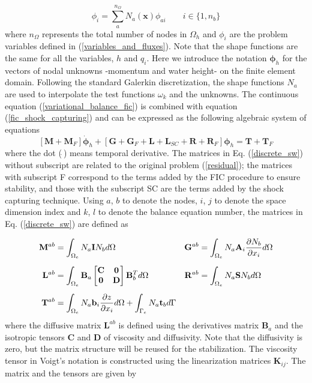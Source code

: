\begin{equation}
\phi_i = \sum_a^{n_\Omega} N_a(\mathbf{x})\phi_{ai} \qquad i \in \{1,n_b\}
\end{equation}
where $n_\Omega$ represents the total number of nodes in $\Omega_h$ and $\phi_i$ are the problem variables defined in (\ref{variables_and_fluxes}).
Note that the shape functions are the same for all the variables, $h$ and $q_i$.
Here we introduce the notation $\bm{\phi}_h$ for the vectors of nodal unknowns -momentum and water height- on the finite element domain. Following the standard Galerkin discretization, the shape functions $N_a$ are used to interpolate the test functions $\omega_k$ and the unknowns. The continuous equation (\ref{variational_balance_fic}) is combined with equation (\ref{fic_shock_capturing}) and can be expressed as the following algebraic system of equations
\begin{equation} \label{discrete_sw}
[\mathbf{M} + \mathbf{M}_F] \dot{\bm{\phi}}_h
+ [\mathbf{G} + \mathbf{G}_F + \mathbf{L} + \mathbf{L}_{SC} + \mathbf{R} + \mathbf{R}_F] \bm{\phi}_h
= \mathbf{T} + \mathbf{T}_F
\end{equation}
where the dot ($\dot{\ }$) means temporal derivative. The matrices in Eq. (\ref{discrete_sw}) without subscript are related to the original problem (\ref{residual}); the matrices with subscript F correspond to the terms added by the FIC procedure to ensure stability, and those with the subscript SC are the terms added by the shock capturing technique. Using $a$, $b$ to denote the nodes, $i$, $j$ to denote the space dimension index and $k$, $l$ to denote the balance equation number, the matrices in Eq. (\ref{discrete_sw}) are defined as

\begin{align} \label{discrete_sw_matrices}
    \displaystyle \mathbf{M}^{ab} &= \int_{\Omega_e}N_a \mathbf{I} N_b d\Omega &
    \displaystyle \mathbf{G}^{ab} &= \int_{\Omega_e}
        N_a \mathbf{A}_i \frac{\partial N_b}{\partial x_i} d\Omega \nonumber\\[5pt]
    \displaystyle \mathbf{L}^{ab} &= \int_{\Omega_e}
        \mathbf{B}_a \left[\begin{matrix}
            \mathbf{C} & \mathbf{0} \\ \mathbf{0} & \mathbf{D}
        \end{matrix}\right] \mathbf{B}_b^T d\Omega &
    \displaystyle \mathbf{R}^{ab} &= \int_{\Omega_e} N_a \mathbf{S} N_b d\Omega \\[5pt]
    \displaystyle \mathbf{T}^{ab} &= \int_{\Omega_e} N_a \mathbf{b}_i \frac{\partial z}{\partial x_i} d\Omega +
        \int_{\Gamma_e} N_a \mathbf{t}_b d\Gamma \nonumber
\end{align}
where the diffusive matrix $\mathbf{L}^{ab}$ is defined using the derivatives matrix $\mathbf{B}_a$ and the isotropic tensors $\mathbf{C}$ and $\mathbf{D}$ of viscosity and diffusivity. Note that the diffusivity is zero, but the matrix structure will be reused for the stabilization. The viscosity tensor in Voigt's notation is constructed using the linearization matrices $\mathbf{K}_{ij}$.
The matrix and the tensors are given by

